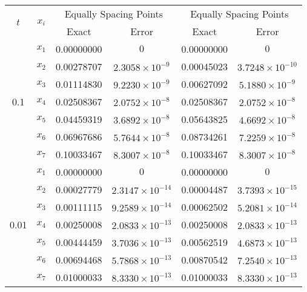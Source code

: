 \documentclass[12pt, a4paper]{article}
\begin{document}
\begin{table}[ht]
	\renewcommand{\arraystretch}{1.5}
	\centering
	\begin{tabular}{|c|c|c|c|c|c|}
		\hline
		\multirow{2}{*}{\( t \)} & \multirow{2}{*}{\( x_i \)} & \multicolumn{2}{c|}{Equally Spacing Points} & \multicolumn{2}{c|}{Equally Spacing Points} \\
		\cline{3-6}
		& & Exact & Error & Exact & Error \\
		\hline
		\multirow{7}{*}{0.1} & \( x_1 \) & 0.00000000 & \( 0 \) & 0.00000000 & \( 0 \) \\
		& \( x_2 \) & 0.00278707 & \( 2.3058 \times 10^{-9} \) & 0.00045023 & \( 3.7248 \times 10^{-10} \) \\
		& \( x_3 \) & 0.01114830 & \( 9.2230 \times 10^{-9} \) & 0.00627092 & \( 5.1880 \times 10^{-9} \) \\
		& \( x_4 \) & 0.02508367 & \( 2.0752 \times 10^{-8} \) & 0.02508367 & \( 2.0752 \times 10^{-8} \) \\
		& \( x_5 \) & 0.04459319 & \( 3.6892 \times 10^{-8} \) & 0.05643825 & \( 4.6692 \times 10^{-8} \) \\
		& \( x_6 \) & 0.06967686 & \( 5.7644 \times 10^{-8} \) & 0.08734261 & \( 7.2259 \times 10^{-8} \) \\
		& \( x_7 \) & 0.10033467 & \( 8.3007 \times 10^{-8} \) & 0.10033467 & \( 8.3007 \times 10^{-8} \) \\
		\hline
		\multirow{7}{*}{0.01} & \( x_1 \) & 0.00000000 & \( 0 \) & 0.00000000 & \( 0 \) \\
		& \( x_2 \) & 0.00027779 & \( 2.3147 \times 10^{-14} \) & 0.00004487 & \( 3.7393 \times 10^{-15} \) \\
		& \( x_3 \) & 0.00111115 & \( 9.2589 \times 10^{-14} \) & 0.00062502 & \( 5.2081 \times 10^{-14} \) \\
		& \( x_4 \) & 0.00250008 & \( 2.0833 \times 10^{-13} \) & 0.00250008 & \( 2.0833 \times 10^{-13} \) \\
		& \( x_5 \) & 0.00444459 & \( 3.7036 \times 10^{-13} \) & 0.00562519 & \( 4.6873 \times 10^{-13} \) \\
		& \( x_6 \) & 0.00694468 & \( 5.7868 \times 10^{-13} \) & 0.00870542 & \( 7.2540 \times 10^{-13} \) \\
		& \( x_7 \) & 0.01000033 & \( 8.3330 \times 10^{-13} \) & 0.01000033 & \( 8.3330 \times 10^{-13} \) \\
		\hline
	\end{tabular}
\end{table}
\end{document}
